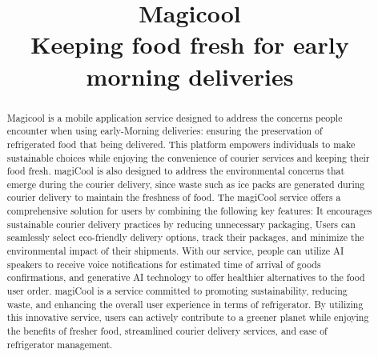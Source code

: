 \documentclass[conference]{IEEEtran}
\begin{document}
\title{Magicool\\
{\footnotesize \large Keeping food fresh for early morning deliveries}}

\author{
\and
{}
\and
{}

}
\maketitle

\begin{abstract}
Magicool is a mobile application service designed to address the concerns people encounter when using early-Morning deliveries: ensuring the preservation of refrigerated food that being delivered. This platform empowers individuals to make sustainable choices while enjoying the convenience of courier services and keeping their food fresh. magiCool is also designed to address the environmental concerns that emerge during the courier delivery, since waste such as ice packs are generated during courier delivery to maintain the freshness of food. The magiCool service offers a comprehensive solution for users by combining the following key features: It encourages sustainable courier delivery practices by reducing unnecessary packaging,  Users can seamlessly select eco-friendly delivery options, track their packages, and minimize the environmental impact of their shipments. With our service, people can utilize AI speakers to receive voice notifications for estimated time of arrival of goods confirmations, and generative AI technology to offer healthier alternatives to the food user order. 
magiCool is a service committed to promoting sustainability, reducing waste, and enhancing the overall user experience in terms of refrigerator. By utilizing this innovative service, users can actively contribute to a greener planet while enjoying the benefits of fresher food, streamlined courier delivery services, and ease of refrigerator management.  

\end{abstract}
\end{document}

